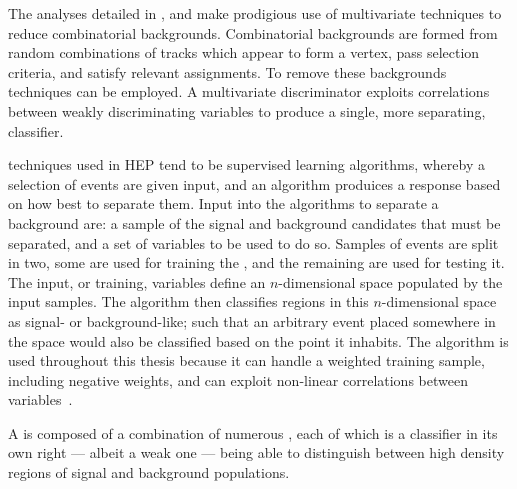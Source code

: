 The analyses detailed in ,  and  make
prodigious use of multivariate techniques to reduce combinatorial backgrounds.
Combinatorial backgrounds are formed from random combinations of tracks which appear to form a
vertex, pass selection criteria, and satisfy relevant \pid assignments.
To remove these backgrounds \MVA techniques can be employed.
A multivariate discriminator exploits correlations between weakly discriminating variables to
produce a single, more separating, classifier.


\MVA techniques used in \gls{HEP} tend to be supervised learning algorithms, whereby a selection of
events are given input, and an algorithm produices a response based on how best to separate them.
Input into the algorithms to separate a background are:
a sample of the signal and background candidates that must be
separated, and a set of variables to be used to do so.
Samples of events are split in two, some are used for training the \MVA, and the remaining are used
for testing it.
The input, or training, variables define an $n$-dimensional space populated by the input samples.
The algorithm then classifies regions in this $n$-dimensional space as signal- or background-like;
such that an arbitrary event placed somewhere in the space would also be classified based on the
point it inhabits.
The \BDT algorithm is used throughout this thesis because it can handle
a weighted training sample, including negative weights, and can exploit non-linear correlations
between variables~\cite{Breiman,Roe}.

A \BDT is composed of a combination of numerous \DTs, each of which is a classifier
in its own right
--- albeit a weak one ---
being able to distinguish between high density regions of signal and
background populations.

